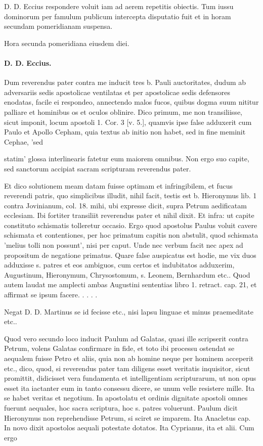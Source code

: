 D. D. Eccius respondere voluit iam ad aerem repetitis obiectis. Tum iussu dominorum per famulum publicum intercepta disputatio fuit et in horam secundam pomeridianam suspensa.

Hora secunda pomeridiana eiusdem diei.

\paragraph*{D. D. Eccius.}

Dum reverendus pater contra me inducit tres b. Pauli auctoritates, dudum ab adversariis sedis apostolicae ventilatas et per apostolicae sedis defensores enodatas, facile ei respondeo, annectendo malos fucos, quibus dogma suum nititur palliare et hominibus os et oculos oblinire. Dico primum, me non transiliisse, sicut imponit, locum apostoli 1. Cor. 3 [v. 5.], quamvis ipse false adduxerit cum Paulo et Apollo Cepham, quia textus ab initio non habet, sed in fine meminit Cephae, 'sed

statim' glossa interlinearis fatetur eum maiorem omnibus. Non ergo suo capite, sed sanctorum accipiat sacram scripturam reverendus pater.

Et dico solutionem meam datam fuisse optimam et infringibilem, et fucus reverendi patris, quo simplicibus illudit, nihil facit, testis est b. Hieronymus lib. 1 contra Jovinianum, col. 18. mihi, ubi expresse dicit, supra Petrum aedificatam ecclesiam. Ibi fortiter transiliit reverendus pater et nihil dixit. Et infra: ut capite constituto schismatis tolleretur \marginpar{\small[305]} occasio. Ergo quod apostolus Paulus voluit cavere schismata et contentiones, per hoc primatum capitis non abstulit, quod schismata 'melius tolli non possunt', nisi per caput. Unde nec verbum facit nec apex ad propositum de negatione primatus. Quare false auspicatus est hodie, me vix duos adduxisse s. patres et eos ambiguos, cum certos et indubitatos adduxerim, Augustinum, Hieronymum, Chrysostomum, s. Leonem, Bernhardum etc.. Quod autem laudat me amplecti ambas Augustini sententias libro 1. retract. cap. 21, et affirmat se ipsum facere. . . . .

Negat D. D. Martinus se id fecisse etc., nisi lapsu linguae et minus praemeditate etc..

Quod vero secundo loco inducit Paulum ad Galatas, quasi ille scripserit contra Petrum, volens Galatas confirmare in fide, et toto ibi processu ostendat se aequalem fuisse Petro et aliis, quia non ab homine neque per hominem acceperit etc., dico, quod, si reverendus pater tam diligens esset veritatis inquisitor, sicut promittit, didicisset vera fundamenta et intelligentiam scripturarum, ut non opus esset ita iactanter eum in tanto consessu dicere, se unum velle resistere mille. Ita se habet veritas et negotium. In apostolatu et ordinis dignitate apostoli omnes fuerunt aequales, hoc sacra scriptura, hoc s. patres voluerunt. Paulum dicit Hieronymus non reprehendisse Petrum, si sciret se imparem. Ita Anacletus cap. In novo dixit apostolos aequali potestate dotatos. Ita Cyprianus, ita et alii. Cum ergo

